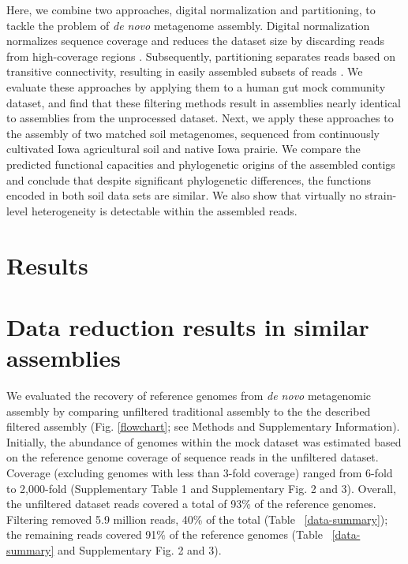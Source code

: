 \documentclass{nature}%
\begin{document}
Here, we combine two approaches, digital normalization and
partitioning, to tackle the problem of {\em de novo} metagenome
assembly.  Digital normalization normalizes sequence coverage and
reduces the dataset size by discarding reads from high-coverage
regions \cite{browndiginorm}.  Subsequently, partitioning separates
reads based on transitive connectivity, resulting in easily assembled
subsets of reads \cite{howeartifacts,Pell:2012cq}.  We evaluate these
approaches by applying them to a human gut mock community dataset, and
find that these filtering methods result in assemblies nearly
identical to assemblies from the unprocessed dataset.  Next, we apply
these approaches to the assembly of two matched soil metagenomes, sequenced from
continuously cultivated Iowa agricultural soil and native Iowa
prairie.  We compare the predicted functional capacities and
phylogenetic origins of the assembled contigs and conclude that
despite significant phylogenetic differences, the functions encoded in
both soil data sets are similar.  We also show that virtually no
strain-level heterogeneity is detectable within the assembled reads.

\section*{Results}

\section*{Data reduction results in similar assemblies}

We evaluated the recovery of reference genomes from {\em de novo}
metagenomic assembly by comparing unfiltered traditional assembly to
the the described filtered assembly (Fig. \ref{flowchart}; see Methods and
Supplementary Information). Initially, the abundance of genomes within the mock
dataset was estimated based on the reference genome coverage of
sequence reads in the unfiltered dataset.  Coverage (excluding genomes
with less than 3-fold coverage) ranged from 6-fold to 2,000-fold
(Supplementary Table 1 and Supplementary Fig. 2 and 3).  Overall, the
unfiltered dataset reads covered a total of 93\% of the reference
genomes.  Filtering removed 5.9 million reads, 40\% of the total (Table ~\ref{data-summary});  the remaining
reads covered 91\% of the reference genomes
(Table ~\ref{data-summary} and Supplementary Fig. 2 and 3).
\end{document}
